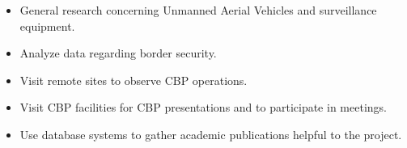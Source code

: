 \duties
\begin{itemize}[leftmargin=*]
\item General research concerning Unmanned Aerial Vehicles and surveillance equipment. 
\item Analyze data regarding border security.
\item Visit remote sites to observe CBP operations.
\item Visit CBP facilities for CBP presentations and to participate in meetings.
\item Use database systems to gather academic publications helpful to the project.
\end{itemize}